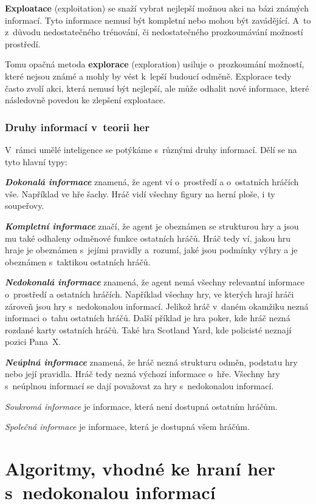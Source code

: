 \textbf{Exploatace} (exploitation) se snaží vybrat nejlepší možnou akci na bázi známých informací.
Tyto informace nemusí být kompletní nebo mohou být zavádějící.
A~to z~důvodu nedostatečného trénování, či nedostatečného prozkoumávání možností prostředí.

Tomu opačná metoda \textbf{explorace} (exploration) usiluje o~prozkoumání možností, které nejsou známé a mohly by vést k~lepší budoucí odměně.
Explorace tedy často zvolí akci, která nemusí být nejlepší, ale může odhalit nové informace, které následovně povedou ke zlepšení exploatace.

\subsection{Druhy informací v~teorii her}\label{subsec:druhy-informaci-v-teorii-her}
V~rámci umělé inteligence se potýkáme s~různými druhy informací.
Dělí se na tyto hlavní typy:

\textbf{\emph{Dokonalá informace}} znamená, že agent ví o~prostředí a o~ostatních hráčích vše.
Například ve hře šachy.
Hráč vidí všechny figury na herní ploše, i ty soupeřovy.

\textbf{\emph{Kompletní informace}} značí, že agent je obeznámen se strukturou hry a jsou mu také odhaleny odměnové funkce ostatních hráčů.
Hráč tedy ví, jakou hru hraje je obeznámen s~jejími pravidly a~rozumí, jaké jsou podmínky výhry a je obeznámen s~taktikou ostatních hráčů.

\textbf{\emph{Nedokonalá informace}} znamená, že agent nemá všechny relevantní informace o~prostředí a ostatních hráčích.
Například všechny hry, ve kterých hrají hráči zároveň jsou hry s~nedokonalou informací.
Jelikož hráč v~daném okamžiku nezná informaci o~tahu ostatních hráčů.
Další příklad je hra poker, kde hráč nezná rozdané karty ostatních hráčů.
Také hra Scotland Yard, kde policisté neznají pozici Pana~X\@.

\textbf{\emph{Neúplná informace}} znamená, že hráč nezná strukturu odměn, podstatu hry nebo její pravidla.
Hráč tedy nezná výchozí informace o~hře.
Všechny hry s~neúplnou informací se dají považovat za hry s~nedokonalou informací.
\bigskip

\emph{Soukromá informace} je informace, která není dostupná ostatním hráčům.

\emph{Společná informace} je informace, která je dostupná všem hráčům.

\chapter{Algoritmy, vhodné ke hraní her s~nedokonalou informací}\label{sec:vhodne-algoritmy-k-reseni-her-s-nedokonalou-informaci}

